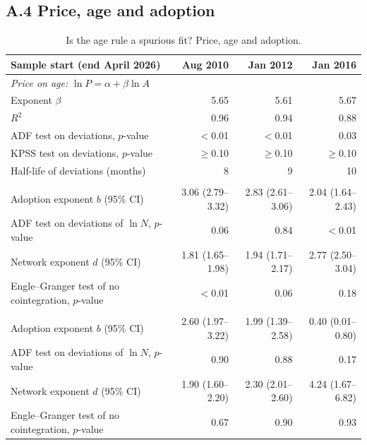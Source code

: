 \documentclass[12pt]{article}
\theoremstyle{plain}
\theoremstyle{remark}
\begin{document}
\subsection*{A.4 Price, age and adoption}

\begin{table}[H]
\centering
\caption{Is the age rule a spurious fit? Price, age and adoption.}
\label{tab:adoption}
\footnotesize\setlength{\tabcolsep}{4pt}
\begin{tabular}{lrrr}
\toprule
Sample start (end April 2026) & Aug 2010 & Jan 2012 & Jan 2016\\
\midrule
\multicolumn{4}{l}{\textit{Price on age:} $\ln P=\alpha+\beta\ln A$}\\
\quad Exponent $\beta$ & 5.65 & 5.61 & 5.67 \\
\quad $R^2$ & 0.96 & 0.94 & 0.88 \\
\quad ADF test on deviations, $p$-value & $<$0.01 & $<$0.01 & 0.03 \\
\quad KPSS test on deviations, $p$-value & $\geq$0.10 & $\geq$0.10 & $\geq$0.10 \\
\quad Half-life of deviations (months) & 8 & 9 & 10 \\
\addlinespace
\multicolumn{4}{l}{\textit{Holder addresses (non-zero balance):} $\ln N=a+b\ln A$; $\ln P=c+d\ln N$}\\
\quad Adoption exponent $b$ (95\% CI) & 3.06 (2.79--3.32) & 2.83 (2.61--3.06) & 2.04 (1.64--2.43) \\
\quad ADF test on deviations of $\ln N$, $p$-value & 0.06 & 0.84 & $<$0.01 \\
\quad Network exponent $d$ (95\% CI) & 1.81 (1.65--1.98) & 1.94 (1.71--2.17) & 2.77 (2.50--3.04) \\
\quad Engle--Granger test of no cointegration, $p$-value & $<$0.01 & 0.06 & 0.18 \\
\addlinespace
\multicolumn{4}{l}{\textit{Active addresses:} $\ln N=a+b\ln A$; $\ln P=c+d\ln N$}\\
\quad Adoption exponent $b$ (95\% CI) & 2.60 (1.97--3.22) & 1.99 (1.39--2.58) & 0.40 (0.01--0.80) \\
\quad ADF test on deviations of $\ln N$, $p$-value & 0.90 & 0.88 & 0.17 \\
\quad Network exponent $d$ (95\% CI) & 1.90 (1.60--2.20) & 2.30 (2.01--2.60) & 4.24 (1.67--6.82) \\
\quad Engle--Granger test of no cointegration, $p$-value & 0.67 & 0.90 & 0.93 \\
\bottomrule
\end{tabular}

\end{table}
\end{document}
